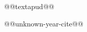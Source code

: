 \documentclass{article}
\begin{document}
@@textapud@@ \par
@@unknown-year-cite@@ \cite{florida2000}\par

\nocite{rego1991,stokes2006,florida2000}
\printbibliography[heading=none]
\end{document}
